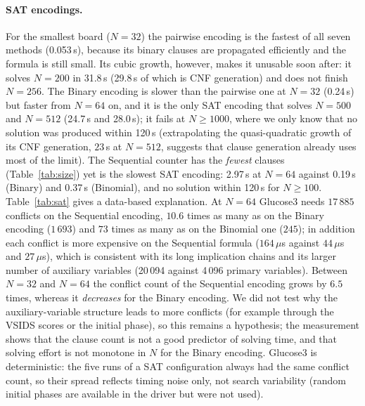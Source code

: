 \documentclass[a4paper,fleqn]{cas-sc}
\begin{document}
\paragraph{SAT encodings.}
For the smallest board ($N=32$) the pairwise encoding is the fastest of all seven methods (0.053\,s), because its binary clauses are propagated efficiently and the formula is still small.
Its cubic growth, however, makes it unusable soon after: it solves $N=200$ in 31.8\,s (29.8\,s of which is CNF generation) and does not finish $N=256$.
The Binary encoding is slower than the pairwise one at $N=32$ (0.24\,s) but faster from $N=64$ on, and it is the only SAT encoding that solves $N=500$ and $N=512$ (24.7\,s and 28.0\,s); it fails at $N\ge1000$, where we only know that no solution was produced within 120\,s (extrapolating the quasi-quadratic growth of its CNF generation, $23$\,s at $N=512$, suggests that clause generation already uses most of the limit).
The Sequential counter has the \emph{fewest} clauses (Table~\ref{tab:size}) yet is the slowest SAT encoding: 2.97\,s at $N=64$ against 0.19\,s (Binary) and 0.37\,s (Binomial), and no solution within 120\,s for $N\ge100$.
Table~\ref{tab:sat} gives a data-based explanation.
At $N=64$ Glucose3 needs $17\,885$ conflicts on the Sequential encoding, $10.6$ times as many as on the Binary encoding ($1\,693$) and $73$ times as many as on the Binomial one ($245$); in addition each conflict is more expensive on the Sequential formula ($164\,\mu$s against $44\,\mu$s and $27\,\mu$s), which is consistent with its long implication chains and its larger number of auxiliary variables (20\,094 against 4\,096 primary variables).
Between $N=32$ and $N=64$ the conflict count of the Sequential encoding grows by $6.5$ times, whereas it \emph{decreases} for the Binary encoding.
We did not test why the auxiliary-variable structure leads to more conflicts (for example through the VSIDS scores or the initial phase), so this remains a hypothesis; the measurement shows that the clause count is not a good predictor of solving time, and that solving effort is not monotone in $N$ for the Binary encoding.
Glucose3 is deterministic: the five runs of a SAT configuration always had the same conflict count, so their spread reflects timing noise only, not search variability (random initial phases are available in the driver but were not used).
\end{document}
